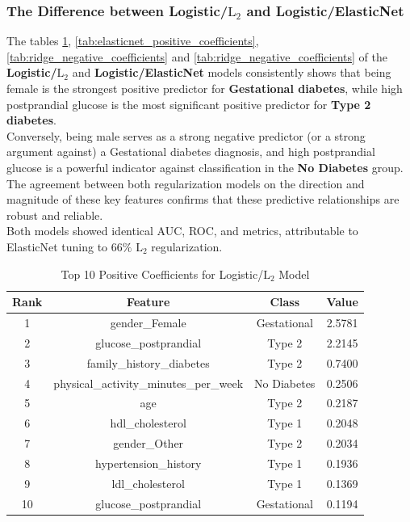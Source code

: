 \documentclass[conference]{IEEEtran}
\begin{document}
\subsubsection{The Difference between Logistic/$\text{L}_2$ and Logistic/ElasticNet}

\indent The tables \ref{tab:ridge_positive_coefficients}, \ref{tab:elasticnet_positive_coefficients}, \ref{tab:ridge_negative_coefficients} and \ref{tab:ridge_negative_coefficients} of the \textbf{Logistic/$\text{L}_2$} and \textbf{Logistic/ElasticNet} models consistently shows that being female is the strongest positive predictor for \textbf{Gestational diabetes}, while high postprandial glucose is the most significant positive predictor for \textbf{Type 2 diabetes}.\\
\indent Conversely, being male serves as a strong negative predictor (or a strong argument against) a Gestational diabetes diagnosis, and high postprandial glucose is a powerful indicator against classification in the \textbf{No Diabetes} group.\\
\indent The agreement between both regularization models on the direction and magnitude of these key features confirms that these predictive relationships are robust and reliable.\\
\indent Both models showed identical AUC, ROC, and metrics, attributable to ElasticNet tuning to $66\%$ $\text{L}_2$ regularization.\\

\begin{table}[h!]\centering
	\caption{Top 10 Positive Coefficients for Logistic/$\text{L}_2$  Model}
	\label{tab:ridge_positive_coefficients}
	\begin{tabular}{|c|c|c|c|}
		\hline
		\textbf{Rank} & \textbf{Feature} & \textbf{Class} & \textbf{Value} \\
		\hline
		1 & gender\_Female & Gestational & 2.5781 \\
		2 & glucose\_postprandial & Type 2 & 2.2145 \\
		3 & family\_history\_diabetes & Type 2 & 0.7400 \\
		4 & physical\_activity\_minutes\_per\_week & No Diabetes & 0.2506 \\
		5 & age & Type 2 & 0.2187 \\
		6 & hdl\_cholesterol & Type 1 & 0.2048 \\
		7 & gender\_Other & Type 2 & 0.2034 \\
		8 & hypertension\_history & Type 1 & 0.1936 \\
		9 & ldl\_cholesterol & Type 1 & 0.1369 \\
		10 & glucose\_postprandial & Gestational & 0.1194 \\
		\hline
	\end{tabular}
\end{table}
\end{document}
